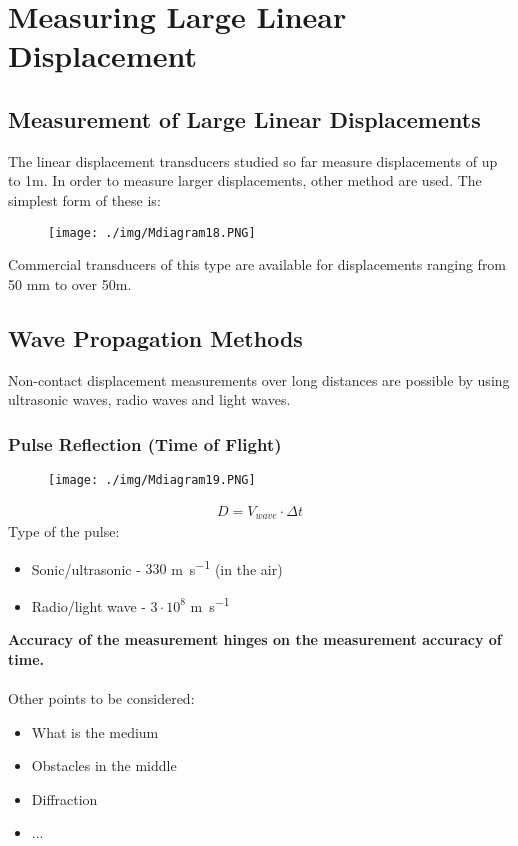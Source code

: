 \section{Measuring Large Linear Displacement}
\subsection{Measurement of Large Linear Displacements}
The linear displacement transducers studied so far measure displacements of up to 1m. In order to measure larger displacements, other method are used. The simplest form of these is:
\begin{figure}[H]
  \centering
  \texttt{[image: ./img/Mdiagram18.PNG]}
\end{figure}
Commercial transducers of this type are available for displacements ranging from 50 mm to over 50m.
\subsection{Wave Propagation Methods}
Non-contact displacement measurements over long distances are possible by using ultrasonic waves, radio waves and light waves.
\subsubsection{Pulse Reflection (Time of Flight)}
\begin{figure}[H]
  \centering
  \texttt{[image: ./img/Mdiagram19.PNG]}
\end{figure}
\begin{gather}
  D = V_{wave} \cdot \Delta t
\end{gather}
Type of the pulse:
\begin{itemize}
  \item Sonic/ultrasonic - $330$ \si{\metre\per\second} (in the air)
  \item Radio/light wave - $3\cdot 10^8$ \si{\metre\per\second}
\end{itemize}
\textbf{Accuracy of the measurement hinges on the measurement accuracy of time.} \\\\
Other points to be considered:
\begin{itemize}
  \item What is the medium
  \item Obstacles in the middle
  \item Diffraction
  \item ...
\end{itemize}
